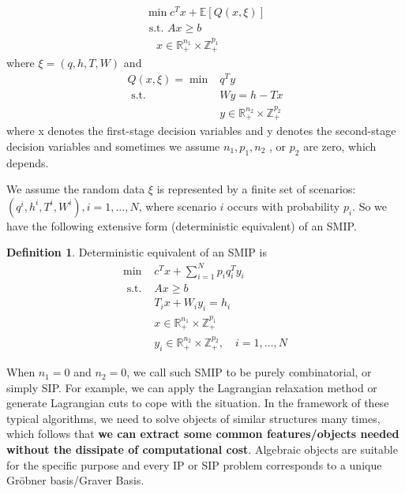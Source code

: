 \documentclass{article}
\theoremstyle{plain}
\theoremstyle{definition}
\newtheorem{definition}[theorem]{Definition}
\begin{document}
\begin{equation}
\begin{array}{l}
\min c^{T} x+\mathbb{E}[Q(x, \xi)] \\
\text { s.t. } A x \geq b \\
\quad x \in \mathbb{R}_{+}^{n_{1}} \times \mathbb{Z}_{+}^{p_{1}}
\end{array}
\end{equation}
where  $\xi=(q, h, T, W)$  and
$$
\begin{aligned}
Q(x, \xi)=\min &  q^{T} y \\
\text { s.t. } & W y=h-T x \\
& y \in \mathbb{R}_{+}^{n_{2}} \times \mathbb{Z}_{+}^{p_{2}} 
\end{aligned}
$$
where x denotes the first-stage decision variables and  y  denotes the second-stage decision variables and sometimes we assume  $n_{1}, p_{1}, n_{2}$ , or  $p_{2}$  are zero, which depends.

We assume the random data  $\xi$  is represented by a finite set of scenarios: $\left(q^{i}, h^{i}, T^{i}, W^{i}\right), i=1, \ldots, N$, where scenario  $i$  occurs with probability  $p_{i}$. So we have the following extensive form (deterministic equivalent) of an SMIP. 

\begin{definition} 
Deterministic equivalent of an SMIP is 
\begin{equation}
\begin{array}{ll}
\min & c^{T} x+\sum_{i=1}^{N} p_{i} q_{i}^{T} y_{i} \\
\text { s.t. } & A x \geq b \\
& T_{i} x+W_{i} y_{i}=h_{i} \\
& x \in \mathbb{R}_{+}^{n_{1}} \times \mathbb{Z}_{+}^{p_{1}} \\
& y_{i} \in \mathbb{R}_{+}^{n_{2}} \times \mathbb{Z}_{+}^{p_{2}}, \quad i=1, \ldots, N
\end{array}
\end{equation}
\end{definition}

When $n_1=0$ and $n_2=0$, we call such SMIP to be purely combinatorial, or simply SIP.  For example, we can apply the Lagrangian relaxation method \cite{Hemmecke and Schultz 2003} or generate Lagrangian cuts \cite{Generating Lagrangian Cuts} to cope with the situation. In the framework of these typical algorithms, we need to solve objects of similar structures many times, which follows that \textbf{we can extract some common features/objects needed without the dissipate of computational cost}. Algebraic objects are suitable for the specific purpose and every IP or SIP problem corresponds to a unique Gröbner basis/Graver Basis.
\end{document}
